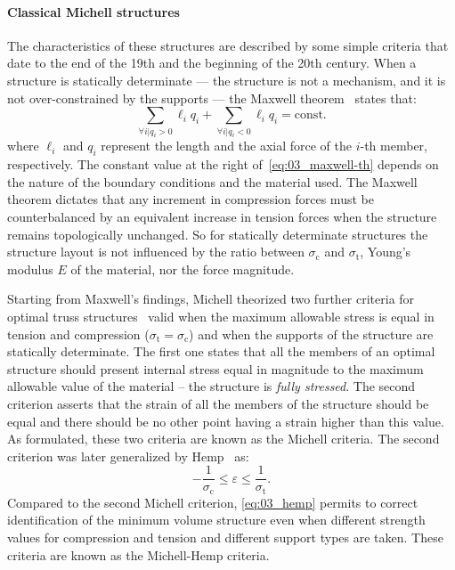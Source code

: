 \paragraph{Classical Michell structures} \label{sec:03_michell}
The characteristics of these structures are described by some simple criteria that date to the end of the 19th and the beginning of the 20th century. When a structure is statically determinate — \ie the structure is not a mechanism, and it is not over-constrained by the supports — the Maxwell theorem~ states that:
\begin{equation} \label{eq:03_maxwell-th}
    \sum_{\forall i | q_i>0}\ell_iq_i + \sum_{\forall i | q_i<0}\ell_iq_i = \textrm{const.}
\end{equation}
where $\ell_i$ and $q_i$ represent the length and the axial force of the $i$-th member, respectively. The constant value at the right of~\eqref{eq:03_maxwell-th} depends on the nature of the boundary conditions and the material used. The Maxwell theorem dictates that any increment in compression forces must be counterbalanced by an equivalent increase in tension forces when the structure remains topologically unchanged. So for statically determinate structures the structure layout is not influenced by the ratio between $\sigma_\text{c}$ and $\sigma_\text{t}$, Young's modulus $E$ of the material, nor the force magnitude.

Starting from Maxwell's findings, Michell theorized two further criteria for optimal truss structures~ valid when the maximum allowable stress is equal in tension and compression ($\sigma_\text{t} = \sigma_\text{c}$) and when the supports of the structure are statically determinate. The first one states that all the members of an optimal structure should present internal stress equal in magnitude to the maximum allowable value of the material -- \ie the structure is \textit{fully stressed}. The second criterion asserts that the strain of all the members of the structure should be equal and there should be no other point having a strain higher than this value. As formulated, these two criteria are known as the Michell criteria. The second criterion was later generalized by Hemp~ as:
\begin{equation} \label{eq:03_hemp}
    -\frac{1}{\sigma_\text{c}}\leq \varepsilon \leq \frac{1}{\sigma_\text{t}}.
\end{equation}
Compared to the second Michell criterion, \eqref{eq:03_hemp} permits to correct identification of the minimum volume structure even when different strength values for compression and tension and different support types are taken. These criteria are known as the Michell-Hemp criteria.

